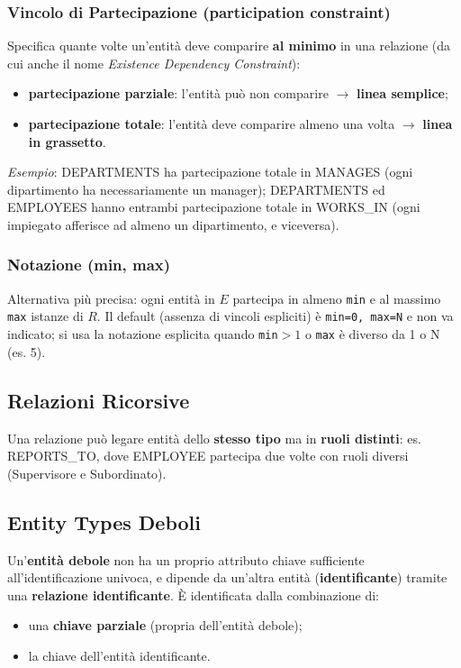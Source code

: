 \documentclass[12pt, a4paper]{article}
\begin{document}
\subsubsection{Vincolo di Partecipazione (participation constraint)}
Specifica quante volte un'entità deve comparire \textbf{al minimo} in una relazione (da cui anche il nome \textit{Existence Dependency Constraint}):
\begin{itemize}
    \item \textbf{partecipazione parziale}: l'entità può non comparire $\to$ \textbf{linea semplice};
    \item \textbf{partecipazione totale}: l'entità deve comparire almeno una volta $\to$ \textbf{linea in grassetto}.
\end{itemize}
\textit{Esempio}: DEPARTMENTS ha partecipazione totale in MANAGES (ogni dipartimento ha necessariamente un manager); DEPARTMENTS ed EMPLOYEES hanno entrambi partecipazione totale in WORKS\_IN (ogni impiegato afferisce ad almeno un dipartimento, e viceversa).

\subsubsection{Notazione (min, max)}
Alternativa più precisa: ogni entità in $E$ partecipa in almeno \texttt{min} e al massimo \texttt{max} istanze di $R$. Il default (assenza di vincoli espliciti) è \texttt{min=0, max=N} e non va indicato; si usa la notazione esplicita quando \texttt{min}$>1$ o \texttt{max} è diverso da 1 o N (es. 5).

\subsection{Relazioni Ricorsive}
Una relazione può legare entità dello \textbf{stesso tipo} ma in \textbf{ruoli distinti}: es. REPORTS\_TO, dove EMPLOYEE partecipa due volte con ruoli diversi (Supervisore e Subordinato).

\subsection{Entity Types Deboli}
Un'\textbf{entità debole} non ha un proprio attributo chiave sufficiente all'identificazione univoca, e dipende da un'altra entità (\textbf{identificante}) tramite una \textbf{relazione identificante}. È identificata dalla combinazione di:
\begin{itemize}
    \item una \textbf{chiave parziale} (propria dell'entità debole);
    \item la chiave dell'entità identificante.
\end{itemize}
\end{document}
